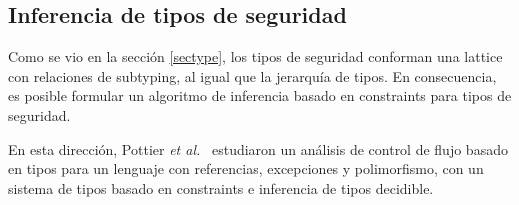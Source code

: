 \subsection{Inferencia de tipos de seguridad}
Como se vio en la sección \ref{sectype}, los tipos de seguridad conforman una lattice con relaciones de subtyping, al igual que la jerarquía de tipos. En consecuencia, es posible formular un algoritmo de inferencia basado en constraints para tipos de seguridad.

En esta dirección, Pottier \textit{et al.}~\cite{Pottier} estudiaron un análisis de control de flujo basado en tipos para un lenguaje con referencias, excepciones y polimorfismo, con un sistema de tipos basado en constraints e inferencia de tipos decidible.
